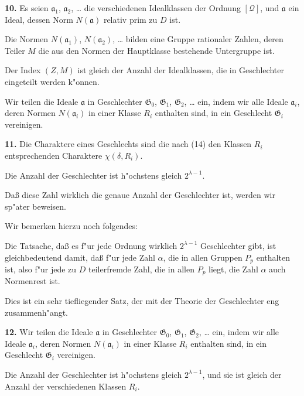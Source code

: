 \documentclass[11pt,a4paper]{article}
\theoremstyle{plain}
\begin{document}
\smallskip

\textbf{10.} Es seien $\mathfrak{a}_1$, $\mathfrak{a}_2$, \dots{} die verschiedenen Idealklassen der Ordnung $[\mathcal{Q}]$, und $\mathfrak{a}$ ein Ideal, dessen Norm $N(\mathfrak{a})$ relativ prim zu $D$ ist.

Die Normen $N(\mathfrak{a}_1)$, $N(\mathfrak{a}_2)$, \dots{} bilden eine Gruppe rationaler Zahlen, deren Teiler $M$ die aus den Normen der Hauptklasse bestehende Untergruppe ist.

Der Index $(Z, M)$ ist gleich der Anzahl der Idealklassen, die in Geschlechter eingeteilt werden k"{o}nnen.

Wir teilen die Ideale $\mathfrak{a}$ in Geschlechter $\mathfrak{G}_0$, $\mathfrak{G}_1$, $\mathfrak{G}_2$, \dots{} ein, indem wir alle Ideale $\mathfrak{a}_i$, deren Normen $N(\mathfrak{a}_i)$ in einer Klasse $R_i$ enthalten sind, in ein Geschlecht $\mathfrak{G}_i$ vereinigen.

\smallskip

\textbf{11.} Die Charaktere eines Geschlechts sind die nach (14) den Klassen $R_i$ entsprechenden Charaktere $\chi(\delta, R_i)$.

Die Anzahl der Geschlechter ist h"{o}chstens gleich $2^{\lambda-1}$.

Da\ss{} diese Zahl wirklich die genaue Anzahl der Geschlechter ist, werden wir sp"{a}ter beweisen.

\newpage
\setcounter{page}{396}

Wir bemerken hierzu noch folgendes:

Die Tatsache, da\ss{} es f"{u}r jede Ordnung wirklich $2^{\lambda-1}$ Geschlechter gibt, ist gleichbedeutend damit, da\ss{} f"{u}r jede Zahl $\alpha$, die in allen Gruppen $P_p$ enthalten ist, also f"{u}r jede zu $D$ teilerfremde Zahl, die in allen $P_p$ liegt, die Zahl $\alpha$ auch Normenrest ist.

Dies ist ein sehr tiefliegender Satz, der mit der Theorie der Geschlechter eng zusammenh"{a}ngt.

\smallskip

\textbf{12.} Wir teilen die Ideale $\mathfrak{a}$ in Geschlechter $\mathfrak{G}_0$, $\mathfrak{G}_1$, $\mathfrak{G}_2$, \dots{} ein, indem wir alle Ideale $\mathfrak{a}_i$, deren Normen $N(\mathfrak{a}_i)$ in einer Klasse $R_i$ enthalten sind, in ein Geschlecht $\mathfrak{G}_i$ vereinigen.

Die Anzahl der Geschlechter ist h"{o}chstens gleich $2^{\lambda-1}$, und sie ist gleich der Anzahl der verschiedenen Klassen $R_i$.
\end{document}
